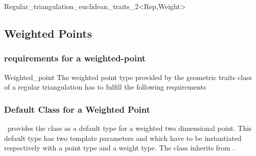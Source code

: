 \begin{ccClassTemplate}{Regular_triangulation_euclidean_traits_2<Rep,Weight>}

 \ccInheritsFrom


\ccTypes
{}
\ccGlue
{}

\end{ccClassTemplate}

\subsection{Weighted Points}

\subsubsection{requirements for a weighted-point}
\begin{ccClass}{Weighted_point}
The weighted point type  provided by the geometric traits class
of a regular triangulation has to fulfill
the following requirements


\ccThreeToTwo
\ccTypes
{}
\ccGlue
{}
\ccGlue
{}

\ccInheritsFrom {}

\ccCreation
{}
\ccGlue
{}

\ccAccessFunctions
{}
\ccGlue
{}

\end{ccClass}


\subsubsection{Default Class for a Weighted Point}
\cgal\ provides the class 
as a default type for a  weighted two dimensional point.
This default type has two template parameters 
and   which have to be instantiated respectively 
with a point type and a weight type.
The class 
 inherits from .




